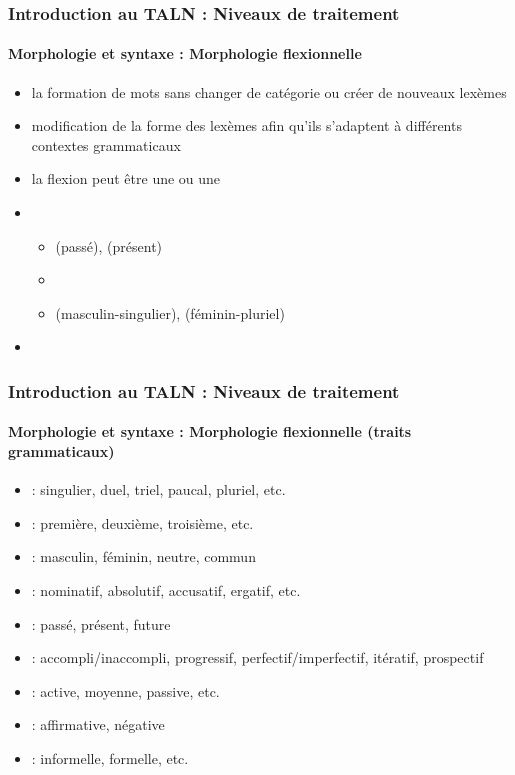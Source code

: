 \documentclass[xcolor=table]{beamer}
\begin{document}
\begin{frame}
\frametitle{Introduction au TALN : Niveaux de traitement}
\framesubtitle{Morphologie et syntaxe : Morphologie flexionnelle}

\begin{itemize}
	\item la formation de mots sans changer de catégorie ou créer de nouveaux lexèmes 
	\item modification de la forme des lexèmes afin qu'ils s'adaptent à différents contextes grammaticaux
	\item la flexion peut être une  ou une 
	\item {}
	\begin{itemize}
		\item {}  (passé),  (présent)
		\item {}
		\item {}  (masculin-singulier),  (féminin-pluriel)
	\end{itemize}
	\item {}  
	
\end{itemize}


\end{frame}

\begin{frame}
\frametitle{Introduction au TALN : Niveaux de traitement}
\framesubtitle{Morphologie et syntaxe : Morphologie flexionnelle (traits grammaticaux)}

\begin{itemize}
	\item {} : singulier, duel, triel, paucal, pluriel, etc. 
	\item {} : première, deuxième, troisième, etc.
	\item {} : masculin, féminin, neutre, commun 
	\item {} : nominatif, absolutif, accusatif, ergatif, etc.
	\item {} : passé, présent, future
	\item {} : accompli/inaccompli, progressif, perfectif/imperfectif, itératif, prospectif
	\item {} : active, moyenne, passive, etc.
	\item {} : affirmative, négative
	\item {} : informelle, formelle, etc.
\end{itemize}

\end{frame}
\end{document}
